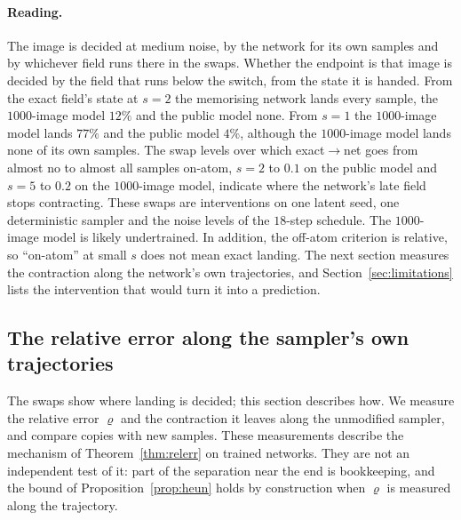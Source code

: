 \documentclass{article} %
\theoremstyle{plain}
\theoremstyle{definition}
\theoremstyle{remark}
\begin{document}
\paragraph{Reading.} The image is decided at medium noise, by the network for its own samples and
by whichever field runs there in the swaps. Whether the endpoint is that image is decided by the
field that runs below the switch, from the state it is handed. From the exact
field's state at $s=2$ the memorising network lands every sample, the $1000$-image model $12\%$
and the public model none. From $s=1$ the $1000$-image model lands $77\%$ and the public model
$4\%$, although the $1000$-image model lands none of its own samples. The swap levels over which
exact$\to$net goes from almost no to almost all samples on-atom, $s=2$ to $0.1$ on the public model
and $s=5$ to $0.2$ on the $1000$-image model, indicate where the network's late field stops
contracting. These swaps are interventions on one latent seed, one
deterministic sampler and the noise levels of the $18$-step schedule. The $1000$-image model is
likely undertrained. In addition, the off-atom criterion is relative, so ``on-atom'' at small $s$ does not
mean exact landing. The next section measures the contraction along the network's own
trajectories, and Section~\ref{sec:limitations} lists the intervention that would turn it into a
prediction.

\FloatBarrier

\subsection{The relative error along the sampler's own trajectories}
\label{sec:contraction}

The swaps show where landing is decided; this section describes how. We measure the relative error
$\varrho$ and the contraction it leaves along the unmodified sampler, and compare copies with new
samples. These measurements describe the mechanism of Theorem~\ref{thm:relerr} on trained
networks. They are not an independent test of it: part of the separation near the end is
bookkeeping, and the bound of Proposition~\ref{prop:heun} holds by construction when $\varrho$ is
measured along the trajectory.
\end{document}
